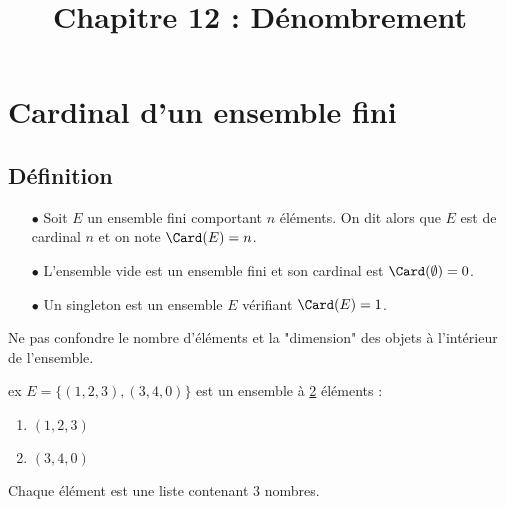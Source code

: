 \documentclass[a4paper, 11pt]{article}
\begin{document}
   
 \title{Chapitre 12 : Dénombrement} 
\vspace{0.5cm}




\section{Cardinal d'un ensemble fini}
\subsection{D\'efinition}

 

\begin{defi} 
\begin{itemize}
\item[$\bullet$] Soit $E$ un ensemble fini comportant $n$ éléments. 
On dit alors que $E$ est de cardinal $n$ et on note $\Card(E)=n$.
\item[$\bullet$] L'ensemble vide est un ensemble fini et son cardinal est $\Card(\emptyset)=0$.
\item[$\bullet$] Un singleton est un ensemble $E$ vérifiant  $\Card(E)=1$.
\end{itemize}
\end{defi}
 
 \warning Ne pas confondre le nombre d'éléments et la "dimension" des objets à l'intérieur de l'ensemble. 
 
 ex $E= \{ (1,2,3), (3,4,0)\}$ est un ensemble à \underline{2} éléments : 
 \begin{enumerate}
 \item $(1,2,3)$
 \item $(3,4,0)$ 
 \end{enumerate}
 Chaque élément est une liste contenant 3 nombres. \warning
\end{document}
